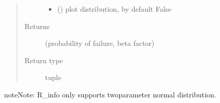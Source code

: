 \documentclass[letterpaper,10pt,english]{sphinxmanual}
\begin{document}
\begin{fulllineitems}
\begin{quote}
\begin{description}
\begin{itemize}
\item {} 
\sphinxAtStartPar
{} (\sphinxstyleliteralemphasis{\sphinxupquote{, }}) \textendash{} plot distribution, by default False

\end{itemize}

\item[{Returns}] \leavevmode
\sphinxAtStartPar
(probability of failure, beta factor)

\item[{Return type}] \leavevmode
\sphinxAtStartPar
tuple

\end{description}\end{quote}

\begin{sphinxadmonition}{note}{Note:}
\sphinxAtStartPar
R\_info only supports two\sphinxhyphen{}parameter normal distribution.
\end{sphinxadmonition}

\end{fulllineitems}

\end{document}
